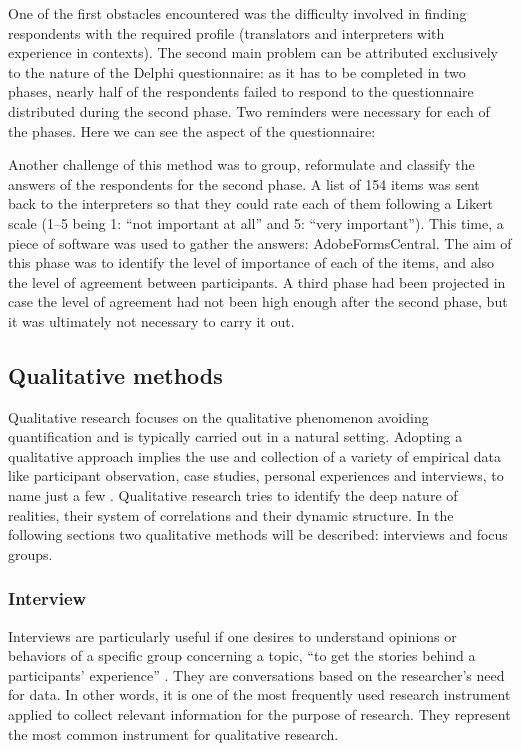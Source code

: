 \documentclass[output=paper]{LSP/langsci}
\begin{document}
One of the first obstacles encountered was the difficulty involved in finding respondents with the required profile (translators and interpreters with experience in  contexts). The second main problem can be attributed exclusively to the nature of the Delphi questionnaire: as it has to be completed in two phases, nearly half of the respondents failed to respond to the questionnaire distributed during the second phase. Two reminders were necessary for each of the phases. Here we can see the aspect of the questionnaire:

Another challenge of this method was to group, reformulate and classify the answers of the respondents for the second phase. A list of 154 items was sent back to the interpreters so that they could rate each of them following a Likert scale (1--5 being 1: ``not important at all'' and 5: ``very important''). This time, a piece of software was used to gather the answers: AdobeFormsCentral. The aim of this phase was to identify the level of importance of each of the items, and also the level of agreement between participants. A third phase had been projected in case the level of agreement had not been high enough after the second phase, but it was ultimately not necessary to carry it out.

\subsection{Qualitative methods} 

Qualitative research focuses on the qualitative phenomenon avoiding quantification and is typically carried out in a natural setting. Adopting a qualitative approach implies the use and collection of a variety of empirical data like participant observation, case studies, personal experiences and interviews, to name just a few \citep[2]{Denzin1994}. Qualitative research tries to identify the deep nature of realities, their system of correlations and their dynamic structure. In the following sections two qualitative methods will be described: interviews and focus groups.

\subsubsection{Interview}

Interviews are particularly useful if one desires to understand opinions or behaviors of a specific group concerning a topic, ``to get the stories behind a participants' experience'' \citep{McNamara1999}. They are conversations based on the researcher's need for data. In other words, it is one of the most frequently used research instrument applied to collect relevant information for the purpose of research. They represent the most common instrument for qualitative research.
\end{document}
